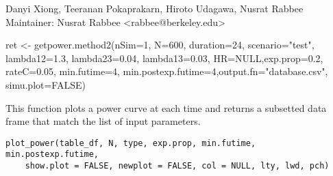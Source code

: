 \documentclass[a4paper]{book}
\begin{document}
%
\begin{Author}\relax
Danyi Xiong, Teeranan Pokaprakarn, Hiroto Udagawa, Nusrat Rabbee \\{}
Maintainer: Nusrat Rabbee <rabbee@berkeley.edu>
\end{Author}
%
\begin{Examples}
\begin{ExampleCode}
ret <- getpower.method2(nSim=1, N=600, duration=24, scenario="test",
  lambda12=1.3, lambda23=0.04, lambda13=0.03, HR=NULL,exp.prop=0.2, rateC=0.05,
  min.futime=4, min.postexp.futime=4,output.fn="database.csv", simu.plot=FALSE) 
\end{ExampleCode}
\end{Examples}
%
\begin{Description}\relax
This function plots a power curve at each time and returns a subsetted data
frame that match the list of input parameters.
\end{Description}
%
\begin{Usage}
\begin{verbatim}
plot_power(table_df, N, type, exp.prop, min.futime, min.postexp.futime,
	show.plot = FALSE, newplot = FALSE, col = NULL, lty, lwd, pch)
\end{verbatim}
\end{Usage}
%
\end{document}
